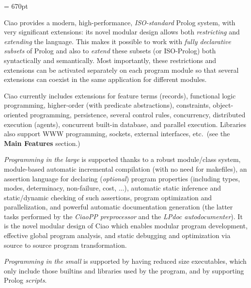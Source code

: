 \documentclass{article}
\newcommand{\ciao}{\psfig{figure=ciao_s.ps,width=2.5cm}}
\begin{document}
\textheight = 670pt
\pagestyle{empty}

\twocolumn[
\noindent
\hbox{
\begin{Huge}
{\bf The 
\begin{minipage}[c]{0.3\textwidth}
\ciao
\end{minipage}
1.10 Prolog System}\\
\end{Huge}
}
\centerline{Ciao is \emph{free software} distributed under GNU
  licenses}  
\vspace{0.5\baselineskip}
]

\noindent
Ciao provides a modern, high-performance, \emph{ISO-standard} Prolog
system, with very significant extensions: its novel modular design
allows both \emph{restricting} and \emph{extending} the language. This
makes it possible to work with \emph{fully declarative subsets} of
Prolog and also to \emph{extend} these subsets (or ISO-Prolog) both
syntactically and semantically.  Most importantly, these restrictions
and extensions can be activated separately on each program module so
that several extensions can coexist in the same application for
different modules.

Ciao currently includes extensions for feature terms (records),
functional logic programming, higher-order (with predicate
abstractions), constraints, object-oriented programming, persistence,
several control rules, concurrency, distributed execution (agents),
concurrent built-in database, and parallel execution.  Libraries also
support WWW programming, sockets, external interfaces, etc.\ (see the
\textbf{Main Features} section.)

\emph{Programming in the large} is supported thanks to a robust
module/class system, module-based automatic incremental compilation
(with no need for makefiles), an assertion language for declaring
(\emph{optional}) program properties (including types, modes,
determinacy, non-failure, cost, ...), automatic static inference and
static/dynamic checking of such assertions, program optimization and
parallelization, and powerful automatic documentation generation (the
latter tasks performed by the \emph{CiaoPP preprocessor} and the
\emph{LPdoc autodocumenter}).  It is the novel modular design of Ciao
which enables modular program development, effective global program
analysis, and static debugging and optimization via source to source
program transformation.

\emph{Programming in the small} is supported by having reduced size
executables, which only include those builtins and libraries used by
the program, and by supporting Prolog \emph{scripts}.
\end{document}
